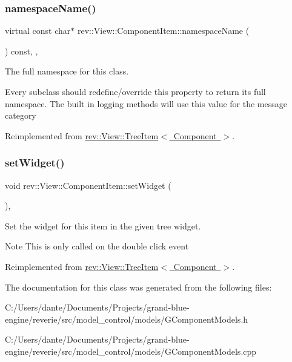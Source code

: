\subsubsection{\texorpdfstring{namespaceName()}{namespaceName()}}
{\footnotesize\ttfamily virtual const char$\ast$ rev\+::\+View\+::\+Component\+Item\+::namespace\+Name (\begin{DoxyParamCaption}{ }\end{DoxyParamCaption}) const\hspace{0.3cm}{\ttfamily [inline]}, {\ttfamily [override]}, {\ttfamily [virtual]}}



The full namespace for this class. 

Every subclass should redefine/override this property to return its full namespace. The built in logging methods will use this value for the message category 

Reimplemented from \mbox{\hyperlink{classrev_1_1_view_1_1_tree_item_a3bb552a87176f4b12848e43dfdd287b2}{rev\+::\+View\+::\+Tree\+Item$<$ Component $>$}}.

\mbox{\label{classrev_1_1_view_1_1_component_item_a0f694632880dffcee4c0225e9e022bb9}} 
\subsubsection{\texorpdfstring{setWidget()}{setWidget()}}
{\footnotesize\ttfamily void rev\+::\+View\+::\+Component\+Item\+::set\+Widget (\begin{DoxyParamCaption}{ }\end{DoxyParamCaption})\hspace{0.3cm}{\ttfamily [override]}, {\ttfamily [virtual]}}



Set the widget for this item in the given tree widget. 

\begin{DoxyNote}{Note}
This is only called on the double click event 
\end{DoxyNote}


Reimplemented from \mbox{\hyperlink{classrev_1_1_view_1_1_tree_item_a24faa4e374ec0728c7eda8f50ca575df}{rev\+::\+View\+::\+Tree\+Item$<$ Component $>$}}.



The documentation for this class was generated from the following files\+:\begin{DoxyCompactItemize}
\item 
C\+:/\+Users/dante/\+Documents/\+Projects/grand-\/blue-\/engine/reverie/src/model\+\_\+control/models/G\+Component\+Models.\+h\item 
C\+:/\+Users/dante/\+Documents/\+Projects/grand-\/blue-\/engine/reverie/src/model\+\_\+control/models/G\+Component\+Models.\+cpp\end{DoxyCompactItemize}
